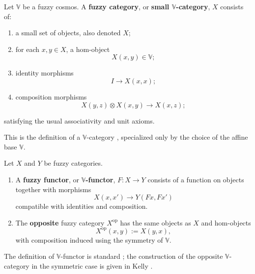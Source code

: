 \begin{definition}\label{def:fuzzy-category}
    Let \(\mathbb V\) be a fuzzy cosmos. A \textbf{fuzzy category}, or \textbf{small \(\mathbb V\)-category}, \(X\) consists of:
    \begin{enumerate}
        \item a small set of objects, also denoted \(X\);

        \item for each \(x,y\in X\), a hom-object
        \[
            X(x,y)\in\mathbb V;
        \]

        \item identity morphisms
        \[
            I\longrightarrow X(x,x);
        \]

        \item composition morphisms
        \[
            X(y,z)\otimes X(x,y)\longrightarrow X(x,z);
        \]
    \end{enumerate}
    satisfying the usual associativity and unit axioms.
\end{definition}

This is the definition of a \(\mathbb V\)-category \cite[Section~1.2]{Kelly1982BasicConcepts}, specialized only by the choice of the affine base \(\mathbb V\).

\begin{definition}
\label{def:fuzzy-functor-opposite}
    Let \(X\) and \(Y\) be fuzzy categories.
    \begin{enumerate}
        \item A \textbf{fuzzy functor}, or \textbf{\(\mathbb V\)-functor}, \(F:X\to Y\) consists of a function on objects together with morphisms
        \[
            X(x,x')\longrightarrow Y(Fx,Fx')
        \]
        compatible with identities and composition.

        \item The \textbf{opposite} fuzzy category \(X^{\mathrm{op}}\) has the same objects as \(X\) and hom-objects
        \[
            X^{\mathrm{op}}(x,y):=X(y,x),
        \]
        with composition induced using the symmetry of \(\mathbb V\).
    \end{enumerate}
\end{definition}

The definition of \(\mathbb V\)-functor is standard \cite[Section~1.2]{Kelly1982BasicConcepts}; the construction of the opposite \(\mathbb V\)-category in the symmetric case is given in Kelly \cite[formula~(1.19)]{Kelly1982BasicConcepts}.

